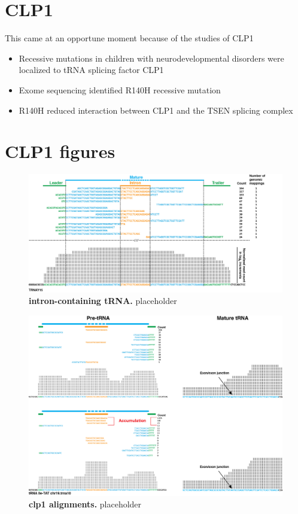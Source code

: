 \documentclass[12pt]{rockefeller}
\begin{document}
\section{CLP1}
This came at an opportune moment because of the studies of CLP1 
\begin{itemize}
\item Recessive mutations in children with neurodevelopmental disorders were localized to tRNA splicing factor CLP1 
\item Exome sequencing identified R140H recessive mutation
\item R140H reduced interaction between CLP1 and the TSEN splicing complex
\end{itemize}

\section{CLP1 figures}

\begin{figure}[!ht]%
\centering
\includegraphics[width=\textwidth]{intron_trna.png}%
\caption[intrno-containing tRNA]
{\textbf{intron-containing tRNA.}
placeholder}
\centering
\label{introntrna}%
\end{figure}

\begin{figure}[!ht]%
\centering
\includegraphics[width=\textwidth]{clp1align.png}%
\caption[clp1 alignments]
{\textbf{clp1 alignments.}
placeholder}
\centering
\label{clp1align}%
\end{figure}
\end{document}
